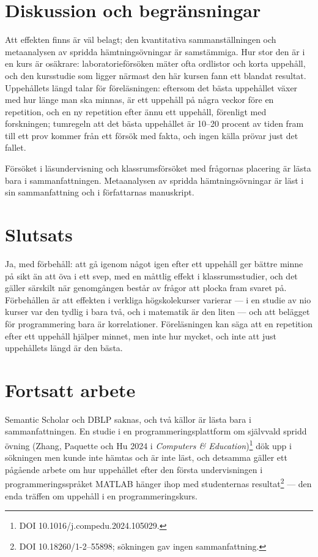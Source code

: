 \section{Diskussion och begränsningar}
\label{sec:recap-spacing-diskussion}

Att effekten finns är väl belagt; den kvantitativa sammanställningen och
metaanalysen av spridda hämtningsövningar är samstämmiga.  Hur stor den
är i en kurs är osäkrare: laboratorieförsöken mäter ofta ordlistor och
korta uppehåll, och den kursstudie som ligger närmast den här kursen
fann ett blandat resultat.  Uppehållets längd talar för föreläsningen:
eftersom det bästa uppehållet växer med hur länge man ska minnas, är ett
uppehåll på några veckor före en repetition, och en ny repetition efter
ännu ett uppehåll, förenligt med forskningen; tumregeln att det bästa
uppehållet är 10--20 procent av tiden fram till ett prov kommer från ett
försök med fakta, och ingen källa prövar just det fallet.

Försöket i läsundervisning och klassrumsförsöket med frågornas placering
är lästa bara i sammanfattningen.  Metaanalysen av
spridda
hämtningsövningar är läst i sin sammanfattning och i författarnas
manuskript.

\section{Slutsats}
\label{sec:recap-spacing-slutsats}

Ja, med förbehåll: att gå igenom något igen efter ett uppehåll ger
bättre minne på sikt än att öva i ett svep, med en måttlig effekt i
klassrumsstudier, och det gäller särskilt när genomgången består av
frågor att plocka fram svaret på.  Förbehållen är att effekten i
verkliga högskolekurser varierar --- i en studie av nio kurser var den
tydlig i bara två, och i matematik är den liten --- och att belägget för
programmering bara är korrelationer.  Föreläsningen kan säga att en repetition
efter ett
uppehåll hjälper minnet, men inte hur mycket, och inte att just
uppehållets längd är den bästa.

\section{Fortsatt arbete}
\label{sec:recap-spacing-fortsatt}

Semantic Scholar och DBLP saknas, och två källor är lästa bara i
sammanfattningen.  En studie i en programmeringsplattform om
självvald spridd övning (Zhang, Paquette och Hu 2024 i
\emph{Computers \& Education})\footnote{DOI 10.1016/j.compedu.2024.105029.}
dök upp i sökningen men kunde inte hämtas och är inte läst, och detsamma
gäller ett pågående arbete om hur uppehållet efter den första
undervisningen i programmeringsspråket MATLAB hänger ihop med
studenternas resultat\footnote{DOI 10.18260/1-2--55898; sökningen gav
ingen sammanfattning.} --- den enda träffen om uppehåll i en
programmeringskurs.

